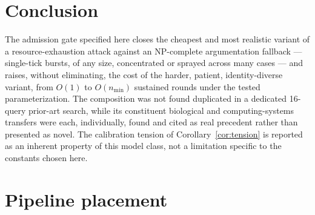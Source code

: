 \documentclass[11pt]{article}
\begin{document}
\section{Conclusion}

The admission gate specified here closes the cheapest and most realistic variant of a
resource-exhaustion attack against an NP-complete argumentation fallback --- single-tick
bursts, of any size, concentrated or sprayed across many cases --- and raises,
without eliminating, the cost of the harder, patient, identity-diverse variant, from
$O(1)$ to $O(n_{\min})$ sustained rounds under the tested parameterization. The
composition was not found duplicated in a dedicated 16-query prior-art search, while
its constituent biological and computing-systems transfers were each, individually,
found and cited as real precedent rather than presented as novel. The calibration
tension of Corollary~\ref{cor:tension} is reported as an inherent property of this
model class, not a limitation specific to the constants chosen here.

\appendix
\section{Pipeline placement}

\begin{center}
\end{center}
\end{document}
